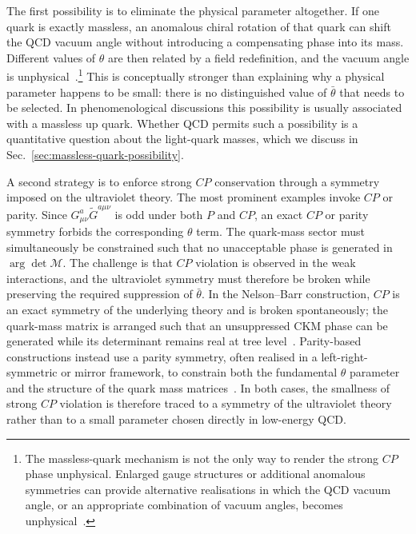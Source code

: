 \documentclass[review]{elsarticle}
\numberwithin{equation}{section}
\numberwithin{table}{section}
\numberwithin{figure}{section}
\def\M{\mathcal{M}}
\begin{document}
The first possibility is to eliminate the physical parameter altogether. If one quark is exactly massless, an anomalous chiral rotation of that quark can shift the QCD vacuum angle without introducing a compensating phase into its mass. Different values of $\theta$ are then related by a field redefinition, and the vacuum angle is unphysical~\cite{Crewther:1979pi,Leutwyler:1992yt}.\footnote{The massless-quark mechanism is not the only way to render the strong $CP$ phase unphysical. Enlarged gauge structures or additional anomalous symmetries can provide alternative realisations in which the QCD vacuum angle, or an appropriate combination of vacuum angles, becomes unphysical~\cite{Aldazabal:2002py,Hsu:2004mf,Hook:2014cda}.} This is conceptually stronger than explaining why a physical parameter happens to be small: there is no distinguished value of $\bar\theta$ that needs to be selected. In phenomenological discussions this possibility is usually associated with a massless up quark. Whether QCD permits such a possibility is a quantitative question about the light-quark masses, which we discuss in Sec.~\ref{sec:massless-quark-possibility}.

A second strategy is to enforce strong $CP$ conservation through a symmetry imposed on the ultraviolet theory. The most prominent examples invoke $CP$ or parity. Since $G^a_{\mu\nu}\widetilde G^{a\mu\nu}$ is odd under both $P$ and $CP$, an exact $CP$ or parity symmetry forbids the corresponding $\theta$ term. The quark-mass sector must simultaneously be constrained such that no unacceptable phase is generated in $\arg\det\M$. The challenge is that $CP$ violation is observed in the weak interactions, and the ultraviolet symmetry must therefore be broken while preserving the required suppression of $\bar\theta$. In the Nelson--Barr construction, $CP$ is an exact symmetry of the underlying theory and is broken spontaneously; the quark-mass matrix is arranged such that an unsuppressed CKM phase can be generated while its determinant remains real at tree level~\cite{Nelson:1983zb,Barr:1984qx}. Parity-based constructions instead use a parity symmetry, often realised in a left-right-symmetric or mirror framework, to constrain both the fundamental $\theta$ parameter and the structure of the quark mass matrices~\cite{Mohapatra:1978fy}. In both cases, the smallness of strong $CP$ violation is therefore traced to a symmetry of the ultraviolet theory rather than to a small parameter chosen directly in low-energy QCD.
\end{document}
